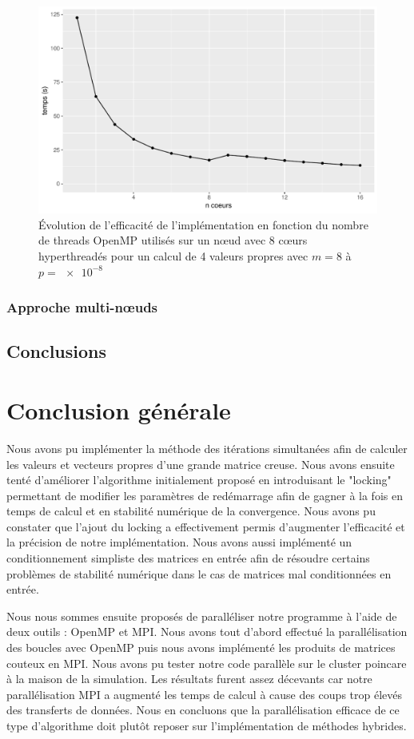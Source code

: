 \documentclass[11pt,a4paper]{article}
\begin{document}
			\begin{figure}
				\includegraphics[width=\linewidth]{plots/omp_perf.pdf}
				\caption{Évolution de l'efficacité de l'implémentation en fonction du nombre de threads OpenMP utilisés sur un nœud avec 8 cœurs hyperthreadés pour un calcul de 4 valeurs propres avec $m = 8$ à $p=\SI{e-8}{}$ \label{fig:omp_perf}}
			\end{figure}

		\subsubsection{Approche multi-n\oe{}uds}

	\subsection{Conclusions}

\section{Conclusion générale}

	Nous avons pu implémenter la méthode des itérations simultanées afin de calculer les valeurs et vecteurs propres d'une grande matrice creuse. Nous avons ensuite tenté d'améliorer l'algorithme initialement proposé en introduisant le "locking" permettant de modifier les paramètres de redémarrage afin de gagner à la fois en temps de calcul et en stabilité numérique de la convergence. Nous avons pu constater que l'ajout du locking a effectivement permis d'augmenter l'efficacité et la précision de notre implémentation. Nous avons aussi implémenté un conditionnement simpliste des matrices en entrée afin de résoudre certains problèmes de stabilité numérique dans le cas de matrices mal conditionnées en entrée.

	Nous nous sommes ensuite proposés de paralléliser notre programme à l'aide de deux outils : OpenMP et MPI. Nous avons tout d'abord effectué la parallélisation des boucles avec OpenMP puis nous avons implémenté les produits de matrices couteux en MPI. Nous avons pu tester notre code parallèle sur le cluster poincare à la maison de la simulation. Les résultats furent assez décevants car notre parallélisation MPI a augmenté les temps de calcul à cause des coups trop élevés des transferts de données. Nous en concluons que la parallélisation efficace de ce type d'algorithme doit plutôt reposer sur l'implémentation de méthodes hybrides.
\end{document}
